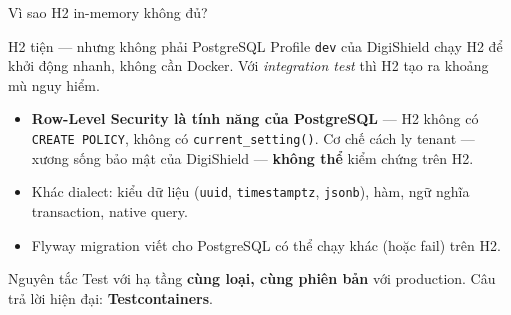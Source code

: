 \documentclass[aspectratio=169,12pt]{beamer}
\begin{document}
\begin{frame}{Vì sao H2 in-memory không đủ?}
  \begin{block}{H2 tiện --- nhưng không phải PostgreSQL}
    Profile \texttt{dev} của DigiShield chạy H2 để khởi động nhanh, không cần
    Docker. Với \emph{integration test} thì H2 tạo ra khoảng mù nguy hiểm.
  \end{block}
  \begin{itemize}\small
    \item \textbf{Row-Level Security là tính năng của PostgreSQL} --- H2 không
      có \texttt{CREATE POLICY}, không có \texttt{current\_setting()}. Cơ chế
      cách ly tenant --- xương sống bảo mật của DigiShield --- \textbf{không
      thể} kiểm chứng trên H2.
    \item Khác dialect: kiểu dữ liệu (\texttt{uuid}, \texttt{timestamptz},
      \texttt{jsonb}), hàm, ngữ nghĩa transaction, native query.
    \item Flyway migration viết cho PostgreSQL có thể chạy khác (hoặc fail)
      trên H2.
  \end{itemize}
  \begin{alertblock}{Nguyên tắc}
    Test với hạ tầng \textbf{cùng loại, cùng phiên bản} với production.
    Câu trả lời hiện đại: \textbf{Testcontainers}.
  \end{alertblock}
\end{frame}
\end{document}
